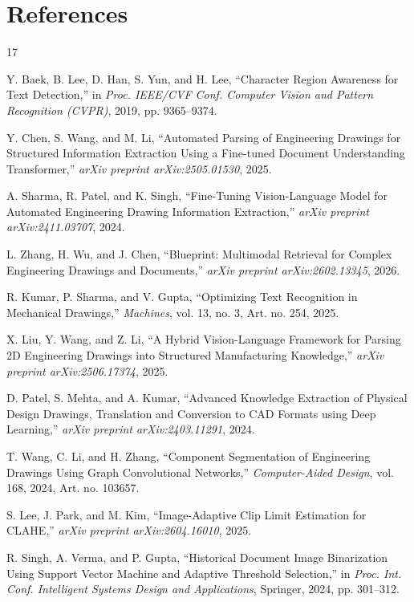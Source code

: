 \documentclass[12pt,a4paper]{article}
\begin{document}
\section{References}

\begin{thebibliography}{17}

Y. Baek, B. Lee, D. Han, S. Yun, and H. Lee, ``Character Region Awareness for Text Detection,'' in \textit{Proc. IEEE/CVF Conf. Computer Vision and Pattern Recognition (CVPR)}, 2019, pp. 9365--9374.

Y. Chen, S. Wang, and M. Li, ``Automated Parsing of Engineering Drawings for Structured Information Extraction Using a Fine-tuned Document Understanding Transformer,'' \textit{arXiv preprint arXiv:2505.01530}, 2025.

A. Sharma, R. Patel, and K. Singh, ``Fine-Tuning Vision-Language Model for Automated Engineering Drawing Information Extraction,'' \textit{arXiv preprint arXiv:2411.03707}, 2024.

L. Zhang, H. Wu, and J. Chen, ``Blueprint: Multimodal Retrieval for Complex Engineering Drawings and Documents,'' \textit{arXiv preprint arXiv:2602.13345}, 2026.

R. Kumar, P. Sharma, and V. Gupta, ``Optimizing Text Recognition in Mechanical Drawings,'' \textit{Machines}, vol. 13, no. 3, Art. no. 254, 2025.

X. Liu, Y. Wang, and Z. Li, ``A Hybrid Vision-Language Framework for Parsing 2D Engineering Drawings into Structured Manufacturing Knowledge,'' \textit{arXiv preprint arXiv:2506.17374}, 2025.

D. Patel, S. Mehta, and A. Kumar, ``Advanced Knowledge Extraction of Physical Design Drawings, Translation and Conversion to CAD Formats using Deep Learning,'' \textit{arXiv preprint arXiv:2403.11291}, 2024.

T. Wang, C. Li, and H. Zhang, ``Component Segmentation of Engineering Drawings Using Graph Convolutional Networks,'' \textit{Computer-Aided Design}, vol. 168, 2024, Art. no. 103657.

S. Lee, J. Park, and M. Kim, ``Image-Adaptive Clip Limit Estimation for CLAHE,'' \textit{arXiv preprint arXiv:2604.16010}, 2025.

R. Singh, A. Verma, and P. Gupta, ``Historical Document Image Binarization Using Support Vector Machine and Adaptive Threshold Selection,'' in \textit{Proc. Int. Conf. Intelligent Systems Design and Applications}, Springer, 2024, pp. 301--312.


\end{thebibliography}
\end{document}
